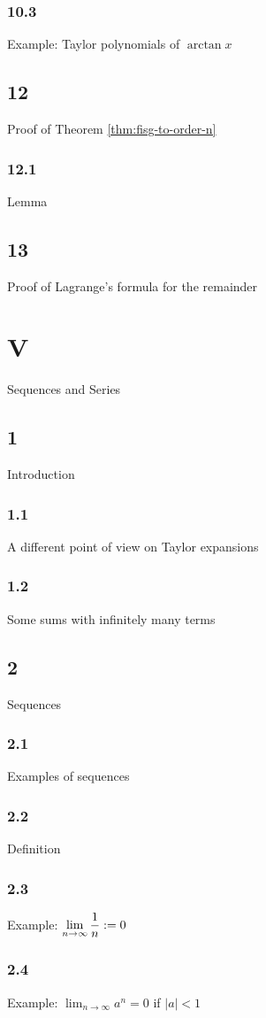 \subsection{10.3}{Example: Taylor polynomials of $\arctan x$}

\section{12}{Proof of Theorem \ref {thm:fisg-to-order-n}}
\subsection{12.1}{Lemma}
\section{13}{Proof of Lagrange's formula for the remainder}
\chapter{V}{Sequences and Series}
\section{1}{Introduction}
\subsection{1.1}{A different point of view on Taylor expansions}
\subsection{1.2}{Some sums with infinitely many terms}
\section{2}{Sequences}
\subsection{2.1}{Examples of sequences}
\subsection{2.2}{Definition}
\subsection{2.3}{Example: $\displaystyle \lim_{n\to \infty } {1\over n}:=0$}
\subsection{2.4}{Example: $\displaystyle \lim_{n\to \infty } a^n=0$ if $|a|<1$}
